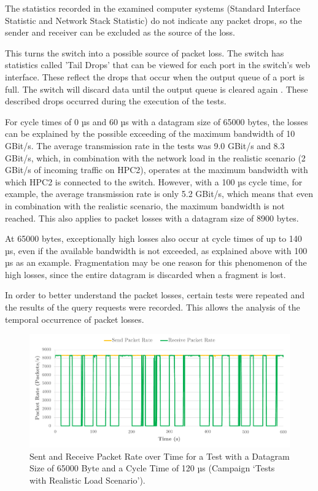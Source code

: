 The statistics recorded in the examined computer systems (Standard Interface Statistic and Network Stack Statistic) do not indicate any packet drops, so the sender and receiver can be excluded as the source of the loss.

This turns the switch into a possible source of packet loss. The switch has statistics called 'Tail Drops' that can be viewed for each port in the switch's web interface. These reflect the drops that occur when the output queue of a port is full. The switch will discard data until the output queue is cleared again \cite {reli02}. These described drops occurred during the execution of the tests.

For cycle times of 0 µs and 60 µs with a datagram size of 65000 bytes, the losses can be explained by the possible exceeding of the maximum bandwidth of 10 GBit/s. The average transmission rate in the tests was 9.0 GBit/s and 8.3 GBit/s, which, in combination with the network load in the realistic scenario (2 GBit/s of incoming traffic on HPC2), operates at the maximum bandwidth with which HPC2 is connected to the switch. However, with a 100 µs cycle time, for example, the average transmission rate is only 5.2 GBit/s, which means that even in combination with the realistic scenario, the maximum bandwidth is not reached. This also applies to packet losses with a datagram size of 8900 bytes.

At 65000 bytes, exceptionally high losses also occur at cycle times of up to 140 µs, even if the available bandwidth is not exceeded, as explained above with 100 µs as an example. Fragmentation may be one reason for this phenomenon of the high losses, since the entire datagram is discarded when a fragment is lost.

In order to better understand the packet losses, certain tests were repeated and the results of the query requests were recorded. This allows the analysis of the temporal occurrence of packet losses.

\begin{figure}[h!]
    \centering
    \includegraphics[width=1\linewidth]{figures/reliability/star/rel_d_4.pdf}
    \caption{Sent and Receive Packet Rate over Time for a Test with a Datagram Size of 65000 Byte and a Cycle Time of 120 µs (Campaign `Tests with Realistic Load Scenario').}
    \label{fig:srpr4}
\end{figure}

